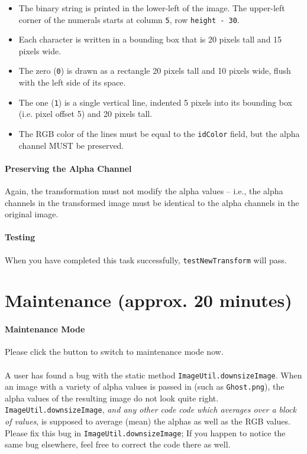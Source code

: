 \documentclass[12pt]{article}
\begin{document}
\begin{itemize}
\item The binary string is printed in the lower-left of the image.
  The upper-left corner of the numerals starts at column \verb|5|, row
  \verb|height - 30|.
\item Each character is written in a bounding box that is 20 pixels
  tall and 15 pixels wide.
\item The zero (\verb|0|) is drawn as a rectangle 20 pixels tall and
  10 pixels wide, flush with the left side of its space.
\item The one (\verb|1|) is a single vertical line, indented 5 pixels
  into its bounding box (i.e. pixel offset 5) and 20 pixels tall.
\item The RGB color of the lines must be equal to the \verb|idColor|
  field, but the alpha channel MUST be preserved.
\end{itemize}

\paragraph{Preserving the Alpha Channel}
Again, the transformation must not modify the alpha values -- i.e.,
the alpha channels in the transformed image must be identical to the
alpha channels in the original image.

\paragraph{Testing}
When you have completed this task successfully,
\verb|testNewTransform| will pass.

\pagebreak

\section{Maintenance (approx. 20 minutes)}

\paragraph{Maintenance Mode}
Please click the button to switch to maintenance mode now.

\paragraph{}
A user has found a bug with the static method
\verb|ImageUtil.downsizeImage|.  When an image with a variety of alpha
values is passed in (such as  \verb|Ghost.png|), the alpha values of the resulting image do not
look quite right.  \verb|ImageUtil.downsizeImage|, \textit{and any
  other code code which averages over a block of values}, is supposed
to average (mean) the alphas as well as the RGB values.  Please fix this bug
in \verb|ImageUtil.downsizeImage|; If you happen to notice the same
bug elsewhere, feel free to correct the code there as well.
\end{document}
